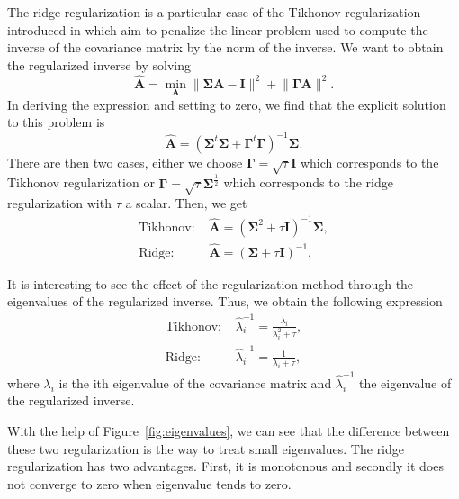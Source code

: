 \documentclass[a4paper,11pt,DIV=16,abstracton]{scrartcl}
\begin{document}
        The ridge regularization is a particular case of the Tikhonov regularization introduced in \cite{hoerl1970ridge} which aim to penalize the linear problem used to compute the inverse of the covariance matrix by the norm of the inverse. We want to obtain the regularized inverse by solving
        \begin{equation}
            \hat{\mathbf{A}} = \min_\mathbf{A} \lVert\boldsymbol{\Sigma} \mathbf{A} - \mathbf{I}\rVert^2 + \lVert\boldsymbol{\Gamma}\mathbf{A}\rVert^2.
        \end{equation}
        In deriving the expression and setting to zero, we find that the explicit solution to this problem is
        \begin{equation}
            \hat{\mathbf{A}} = (\boldsymbol{\Sigma}^t\boldsymbol{\Sigma} + \boldsymbol{\Gamma}^t \boldsymbol{\Gamma})^{-1} \boldsymbol{\Sigma}.
        \end{equation}
        There are then two cases, either we choose $\boldsymbol{\Gamma} = \sqrt{\tau} \mathbf{I}$ which corresponds to the Tikhonov regularization or $\boldsymbol{\Gamma} = \sqrt{\tau} \boldsymbol{\Sigma}^{\frac{1}{2}}$ which corresponds to the ridge regularization with $\tau$ a scalar. Then, we get
        \begin{align}
            \text{Tikhonov: }& \hat{\mathbf{A}} = (\boldsymbol{\Sigma}^2 + \tau \mathbf{I})^{-1} \boldsymbol{\Sigma},\\
            \text{Ridge: }& \hat{\mathbf{A}} = (\boldsymbol{\Sigma} + \tau \mathbf{I})^{-1}.
        \end{align}

        It is interesting to see the effect of the regularization method through the eigenvalues of the regularized inverse. Thus, we obtain the following expression
        \begin{align}
            \text{Tikhonov: }& \hat{\lambda}_i^{-1} = \frac{\lambda_i}{\lambda_i^2 + \tau},\\
            \text{Ridge: }& \hat{\lambda}_i^{-1} = \frac{1}{\lambda_i + \tau},
        \end{align}
        where $\lambda_i$ is the ith eigenvalue of the covariance matrix and $\hat{\lambda}_i^{-1}$ the eigenvalue of the regularized inverse.

        With the help of Figure~\ref{fig:eigenvalues}, we can see that the difference between these two regularization is the way to treat small eigenvalues. The ridge regularization has two advantages. First, it is monotonous and secondly it does not converge to zero when eigenvalue tends to zero.
\end{document}
